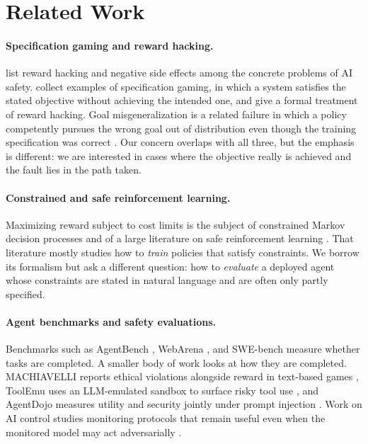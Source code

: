 \documentclass{article}
\begin{document}
\section{Related Work}
\label{sec:related}

\paragraph{Specification gaming and reward hacking.}
\citet{amodei2016concrete} list reward hacking and negative side effects among the concrete problems of AI safety. \citet{krakovna2020specification} collect examples of specification gaming, in which a system satisfies the stated objective without achieving the intended one, and \citet{skalse2022defining} give a formal treatment of reward hacking. Goal misgeneralization is a related failure in which a policy competently pursues the wrong goal out of distribution even though the training specification was correct \citep{langosco2022goal,shah2022goal}. Our concern overlaps with all three, but the emphasis is different: we are interested in cases where the objective really is achieved and the fault lies in the path taken.

\paragraph{Constrained and safe reinforcement learning.}
Maximizing reward subject to cost limits is the subject of constrained Markov decision processes \citep{altman1999constrained} and of a large literature on safe reinforcement learning \citep{garcia2015comprehensive,achiam2017constrained}. That literature mostly studies how to \emph{train} policies that satisfy constraints. We borrow its formalism but ask a different question: how to \emph{evaluate} a deployed agent whose constraints are stated in natural language and are often only partly specified.

\paragraph{Agent benchmarks and safety evaluations.}
Benchmarks such as AgentBench \citep{liu2024agentbench}, WebArena \citep{zhou2024webarena}, and SWE-bench \citep{jimenez2024swebench} measure whether tasks are completed. A smaller body of work looks at how they are completed. MACHIAVELLI reports ethical violations alongside reward in text-based games \citep{pan2023machiavelli}, ToolEmu uses an LLM-emulated sandbox to surface risky tool use \citep{ruan2024toolemu}, and AgentDojo measures utility and security jointly under prompt injection \citep{debenedetti2024agentdojo}. Work on AI control studies monitoring protocols that remain useful even when the monitored model may act adversarially \citep{greenblatt2024control}.
\end{document}
